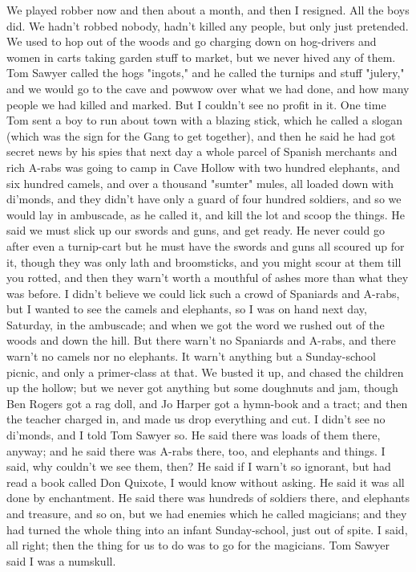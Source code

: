 We played robber now and then about a month, and then I resigned.  All
the boys did.  We hadn't robbed nobody, hadn't killed any people, but
only just pretended.  We used to hop out of the woods and go charging
down on hog-drivers and women in carts taking garden stuff to market, but
we never hived any of them.  Tom Sawyer called the hogs "ingots," and he
called the turnips and stuff "julery," and we would go to the cave and
powwow over what we had done, and how many people we had killed and
marked.  But I couldn't see no profit in it.  One time Tom sent a boy to
run about town with a blazing stick, which he called a slogan (which was
the sign for the Gang to get together), and then he said he had got
secret news by his spies that next day a whole parcel of Spanish
merchants and rich A-rabs was going to camp in Cave Hollow with two
hundred elephants, and six hundred camels, and over a thousand "sumter"
mules, all loaded down with di'monds, and they didn't have only a guard
of four hundred soldiers, and so we would lay in ambuscade, as he called
it, and kill the lot and scoop the things.  He said we must slick up our
swords and guns, and get ready.  He never could go after even a
turnip-cart but he must have the swords and guns all scoured up for it,
though they was only lath and broomsticks, and you might scour at them
till you rotted, and then they warn't worth a mouthful of ashes more than
what they was before.  I didn't believe we could lick such a crowd of
Spaniards and A-rabs, but I wanted to see the camels and elephants, so I
was on hand next day, Saturday, in the ambuscade; and when we got the
word we rushed out of the woods and down the hill.  But there warn't no
Spaniards and A-rabs, and there warn't no camels nor no elephants.  It
warn't anything but a Sunday-school picnic, and only a primer-class at
that.  We busted it up, and chased the children up the hollow; but we
never got anything but some doughnuts and jam, though Ben Rogers got a
rag doll, and Jo Harper got a hymn-book and a tract; and then the teacher
charged in, and made us drop everything and cut.  I didn't see no
di'monds, and I told Tom Sawyer so.  He said there was loads of them
there, anyway; and he said there was A-rabs there, too, and elephants and
things.  I said, why couldn't we see them, then?  He said if I warn't so
ignorant, but had read a book called Don Quixote, I would know without
asking.  He said it was all done by enchantment.  He said there was
hundreds of soldiers there, and elephants and treasure, and so on, but we
had enemies which he called magicians; and they had turned the whole
thing into an infant Sunday-school, just out of spite.  I said, all
right; then the thing for us to do was to go for the magicians.  Tom
Sawyer said I was a numskull.


